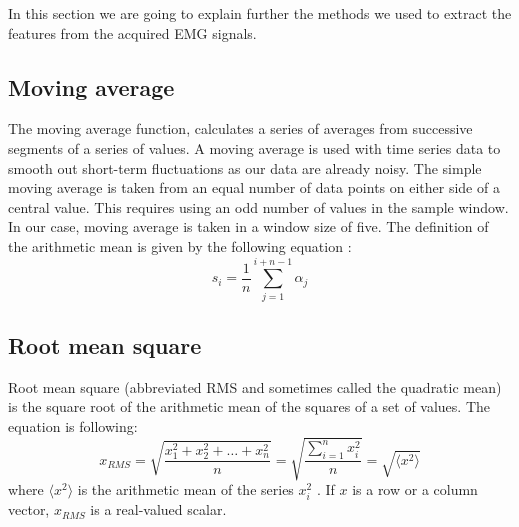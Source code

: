 In this section we are going to explain further the methods we used to extract the features from the acquired EMG signals. 
\subsection{Moving average}
The moving average function, calculates a series of averages from successive segments of a series of values. A moving average is used with time series data to smooth out short-term fluctuations as our data are already noisy. The simple moving average is taken from an equal number of data points on either side of a central value. This requires using an odd number of values in the sample window. In our case, moving average is taken in a window size of five. The definition of the arithmetic mean is given by the following equation \cite{whittaker_calculus_1924}:
\begin{equation}
s_i = \frac{1}{n} \sum_{j=1}^{i+n-1}\alpha_j
\end{equation}
\subsection{Root mean square}
Root mean square (abbreviated RMS and sometimes called the quadratic mean) is the square root of the arithmetic mean of the squares of a set of values. The equation is following:
\begin{equation}
x_{RMS} = \sqrt{\frac{x_1^2+x_2^2+ \hdots + x_n^2}{n}} =
          \sqrt{\frac{\sum_{i=1}^{n}x_i^2}{n}} = \sqrt{\langle x^2 \rangle}
\end{equation}
where $\langle x^2 \rangle$ is the arithmetic mean of the series $x_i^2$ \cite{kenney_mathematics_2013}. If $x$ is a row or a column vector, $x_{RMS}$ is a real-valued scalar. 
